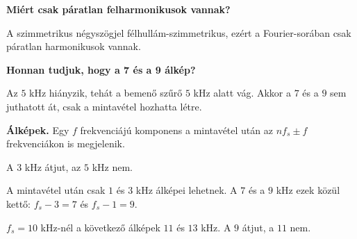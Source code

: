 \begin{elmelet}
\textbf{Miért csak páratlan felharmonikusok vannak?}\par A szimmetrikus négyszögjel félhullám-szimmetrikus, ezért a Fourier-sorában csak páratlan harmonikusok vannak.

\textbf{Honnan tudjuk, hogy a 7 és a 9 álkép?}\par Az $5$ kHz hiányzik, tehát a bemenő szűrő $5$ kHz alatt vág. Akkor a $7$ és a $9$ sem juthatott át, csak a mintavétel hozhatta létre.
\end{elmelet}
\begin{elmelet}
\textbf{Álképek.} Egy $f$ frekvenciájú komponens a mintavétel után az $n f_s\pm f$ frekvenciákon is megjelenik.
\end{elmelet}

A $3$ kHz átjut, az $5$ kHz nem.

\begin{center}\end{center}

A mintavétel után csak $1$ és $3$ kHz álképei lehetnek. A $7$ és a $9$ kHz ezek közül kettő: $f_s-3=7$ és $f_s-1=9$.

\begin{center}\end{center}

\begin{center}\end{center}

\begin{center}\end{center}

$f_s=10$ kHz-nél a következő álképek $11$ és $13$ kHz. A $9$ átjut, a $11$ nem.


